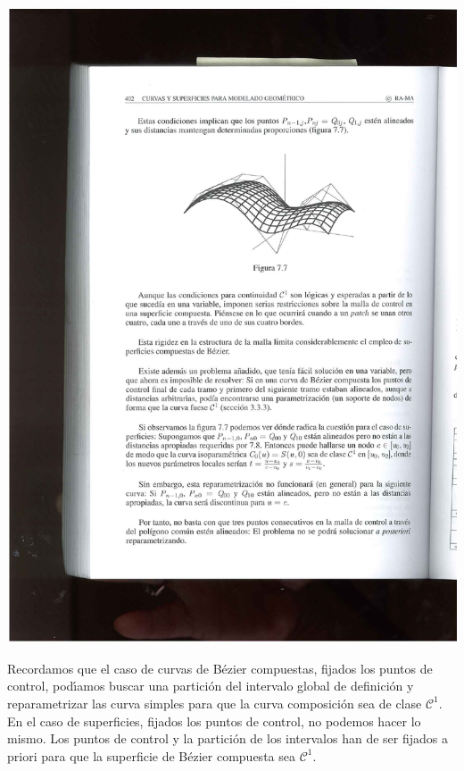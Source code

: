 \documentclass[ebook,oneside]{memoir}
\begin{document}
\begin{center}
\includegraphics[scale=0.45]{7_7.pdf}
\end{center}

Recordamos que el caso de curvas de B\'{e}zier compuestas, fijados los puntos de control, pod\'{\i}amos buscar una partici\'{o}n del intervalo global de definici\'{o}n y reparametrizar las curva simples para que la curva composici\'{o}n sea de clase ${\mathcal  C}^1$. En el caso de superficies, fijados los puntos de control, no podemos hacer lo mismo. Los puntos de control y la partici\'{o}n de los intervalos han de ser fijados a priori para que la superficie de B\'{e}zier compuesta sea ${\mathcal  C}^1$.
\end{document}

